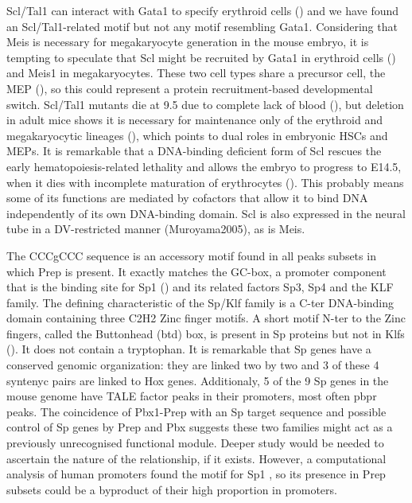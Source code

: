 Scl/Tal1 can interact with Gata1 to specify erythroid cells (\cite{ref}) and we have found an Scl/Tal1-related motif but not any motif resembling Gata1. Considering that Meis is necessary for megakaryocyte generation in the mouse embryo, it is tempting to speculate that Scl might be recruited by Gata1 in erythroid cells (\cite{Anguita2004}) and Meis1 in megakaryocytes. These two cell types share a precursor cell, the \ac{MEP} (\cite{ref}), so this could represent a protein recruitment-based developmental switch. Scl/Tal1 mutants die at 9.5 due to complete lack of blood (\cite{ref}), but deletion in adult mice shows it is necessary for maintenance only of the erythroid and megakaryocytic lineages (\cite{Mikkola2003}), which points to dual roles in embryonic \acp{HSC} and \acp{MEP}. It is remarkable that a DNA-binding deficient form of Scl rescues the early hematopoiesis-related lethality and allows the embryo to progress to E14.5, when it dies with incomplete maturation of erythrocytes (\cite{Porcher1999, Kassouf2008}). This probably means some of its functions are mediated by cofactors that allow it to bind DNA independently of its own DNA-binding domain. Scl is also expressed in the neural tube in a \ac{DV}-restricted manner (Muroyama2005), as is Meis.




The CCCgCCC sequence is an accessory motif found in all peaks subsets in which Prep is present. It exactly matches the GC-box, a promoter component that is the binding site for Sp1 (\cite{Kriwacki1992}) and its related factors Sp3, Sp4 and the KLF family. The defining characteristic of the Sp/Klf family is a \ac{C-ter} DNA-binding domain containing three C2H2 Zinc finger motifs. A short motif \ac{N-ter} to the Zinc fingers, called the Buttonhead (btd) box, is present in Sp proteins but not in Klfs (\cite{Suske2005}). It does not contain a tryptophan. It is remarkable that Sp genes have a conserved genomic organization: they are linked two by two and 3 of these 4 syntenyc pairs are linked to Hox genes. Additionaly, 5 of the 9 Sp genes in the mouse genome have \ac{TALE} factor peaks in their promoters, most often \ac{pbpr} peaks. The coincidence of Pbx1-Prep with an Sp target sequence and possible control of Sp genes by Prep and Pbx suggests these two families might act as a previously unrecognised functional module. Deeper study would be needed to ascertain the nature of the relationship, if it exists. However, a computational analysis of human promoters found the motif for Sp1 \parencite{Hartmann2013}, so its presence in Prep subsets could be a byproduct of their high proportion in promoters.

